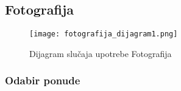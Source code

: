 \documentclass[a4paper]{article}
\begin{document}

\subsection{Fotografija}

\begin{figure}[htp]
    \centering
    \texttt{[image: fotografija\_dijagram1.png]}
    \caption{Dijagram slučaja upotrebe Fotografija}
    \label{fig:PrenosiviBar}
\end{figure}

\subsubsection{Odabir ponude}
\end{document}

